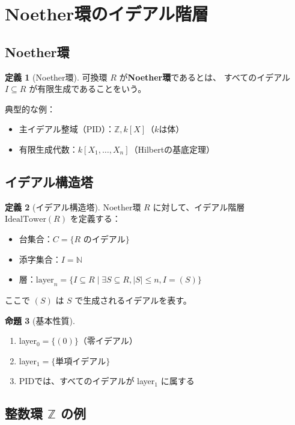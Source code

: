 \documentclass[a4paper,12pt]{ltjsarticle}
\theoremstyle{definition}
\newtheorem{definition}{定義}[section]
\newtheorem{proposition}[definition]{命題}
\begin{document}
\section{Noether環のイデアル階層}

\subsection{Noether環}

\begin{definition}[Noether環]
可換環 $R$ が\textbf{Noether環}であるとは、
すべてのイデアル $I \subseteq R$ が有限生成であることをいう。
\end{definition}

典型的な例：
\begin{itemize}
  \item 主イデアル整域（PID）：$\mathbb{Z}, k[X]$（$k$は体）
  \item 有限生成代数：$k[X_1, \ldots, X_n]$（Hilbertの基底定理）
\end{itemize}

\subsection{イデアル構造塔}

\begin{definition}[イデアル構造塔]
Noether環 $R$ に対して、イデアル階層 $\text{IdealTower}(R)$ を定義する：
\begin{itemize}
  \item 台集合：$C = \{\text{$R$ のイデアル}\}$
  \item 添字集合：$I = \mathbb{N}$
  \item 層：$\text{layer}_n = \{I \subseteq R \mid
    \exists S \subseteq R, |S| \leq n, I = (S)\}$
\end{itemize}
ここで $(S)$ は $S$ で生成されるイデアルを表す。
\end{definition}

\begin{proposition}[基本性質]
\begin{enumerate}
  \item layer$_0 = \{(0)\}$（零イデアル）
  \item layer$_1 = \{$単項イデアル$\}$
  \item PIDでは、すべてのイデアルが layer$_1$ に属する
\end{enumerate}
\end{proposition}

\subsection{整数環 $\mathbb{Z}$ の例}
\end{document}
